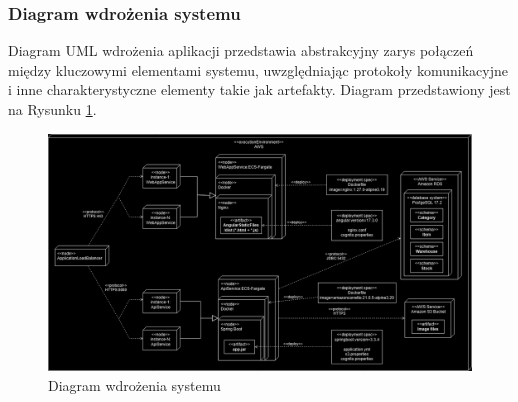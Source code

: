 \documentclass[../main.tex]{subfiles}
\begin{document}
        \subsubsection*{Diagram wdrożenia systemu}
        Diagram UML wdrożenia aplikacji przedstawia abstrakcyjny zarys połączeń między kluczowymi elementami systemu, uwzględniając protokoły komunikacyjne i inne charakterystyczne elementy takie jak artefakty. Diagram przedstawiony jest na Rysunku \ref{fig:deployment-diagram}.
        \begin{figure}[H]
            \centering
            \includegraphics[width=1.0\linewidth]{images/deployment-diagram.png}
            \caption{Diagram wdrożenia systemu}
            \label{fig:deployment-diagram}
        \end{figure}

\end{document}
